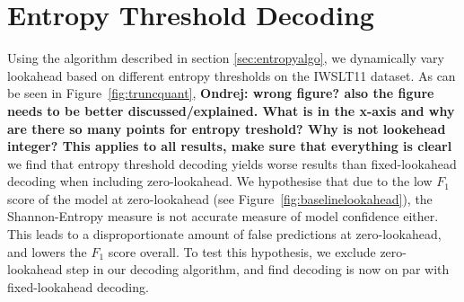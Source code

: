 \documentclass[bsc,deptreport,ai]{infthesis} %
\newcommand{\Ondrej}[1]{{\color{red} \textbf{Ondrej: #1}}}
\begin{document}
\section{Entropy Threshold Decoding}
Using the algorithm described in section \ref{sec:entropyalgo}, we dynamically vary lookahead based on different entropy thresholds on the IWSLT11 dataset. As can be seen in Figure~\ref{fig:truncquant},\Ondrej{wrong figure? also the figure needs to be better discussed/explained. What is in the x-axis and why are there so many points for entropy treshold? Why is not lookehead integer? This applies to all results, make sure that everything is clearl} we find that entropy threshold decoding yields worse results than fixed-lookahead decoding when including zero-lookahead. We hypothesise that due to the low $F_1$ score of the model at zero-lookahead (see Figure~\ref{fig:baselinelookahead}), the Shannon-Entropy measure is not accurate measure of model confidence either. This leads to a disproportionate amount of false predictions at zero-lookahead, and lowers the $F_1$ score overall. To test this hypothesis, we exclude zero-lookahead step in our decoding algorithm, and find decoding is now on par with fixed-lookahead decoding.
\end{document}
